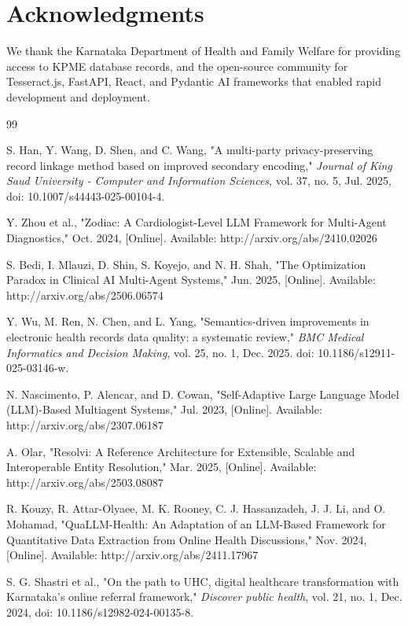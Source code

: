 \documentclass[conference]{IEEEtran}
\begin{document}
\section*{Acknowledgments}

We thank the Karnataka Department of Health and Family Welfare for providing access to KPME database records, and the open-source community for Tesseract.js, FastAPI, React, and Pydantic AI frameworks that enabled rapid development and deployment.

\begin{thebibliography}{99}

S. Han, Y. Wang, D. Shen, and C. Wang, "A multi-party privacy-preserving record linkage method based on improved secondary encoding," \textit{Journal of King Saud University - Computer and Information Sciences}, vol. 37, no. 5, Jul. 2025, doi: 10.1007/s44443-025-00104-4.

Y. Zhou et al., "Zodiac: A Cardiologist-Level LLM Framework for Multi-Agent Diagnostics," Oct. 2024, [Online]. Available: http://arxiv.org/abs/2410.02026

S. Bedi, I. Mlauzi, D. Shin, S. Koyejo, and N. H. Shah, "The Optimization Paradox in Clinical AI Multi-Agent Systems," Jun. 2025, [Online]. Available: http://arxiv.org/abs/2506.06574

Y. Wu, M. Ren, N. Chen, and L. Yang, "Semantics-driven improvements in electronic health records data quality: a systematic review," \textit{BMC Medical Informatics and Decision Making}, vol. 25, no. 1, Dec. 2025. doi: 10.1186/s12911-025-03146-w.

N. Nascimento, P. Alencar, and D. Cowan, "Self-Adaptive Large Language Model (LLM)-Based Multiagent Systems," Jul. 2023, [Online]. Available: http://arxiv.org/abs/2307.06187

A. Olar, "Resolvi: A Reference Architecture for Extensible, Scalable and Interoperable Entity Resolution," Mar. 2025, [Online]. Available: http://arxiv.org/abs/2503.08087

R. Kouzy, R. Attar-Olyaee, M. K. Rooney, C. J. Hassanzadeh, J. J. Li, and O. Mohamad, "QuaLLM-Health: An Adaptation of an LLM-Based Framework for Quantitative Data Extraction from Online Health Discussions," Nov. 2024, [Online]. Available: http://arxiv.org/abs/2411.17967

S. G. Shastri et al., "On the path to UHC, digital healthcare transformation with Karnataka's online referral framework," \textit{Discover public health}, vol. 21, no. 1, Dec. 2024, doi: 10.1186/s12982-024-00135-8.


\end{thebibliography}
\end{document}
